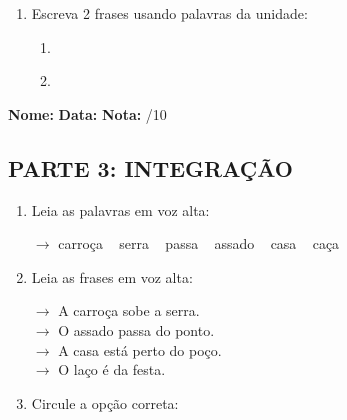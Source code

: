 \begin{exercicio}
\begin{enumerate}[resume]
  \item Escreva 2 frases usando palavras da unidade:
  \begin{enumerate}[label=\alph*)]
    \item \underline{\hspace{8cm}}
    \item \underline{\hspace{8cm}}
  \end{enumerate}

\end{enumerate}

\end{exercicio}



\begin{exercicio}

\noindent\textbf{Nome:} \underline{\hspace{3.2cm}} \quad \textbf{Data:} \underline{\hspace{1.6cm}} \quad \textbf{Nota:} \underline{\hspace{0.9cm}}/10


\subsection*{PARTE 3: INTEGRAÇÃO}

\begin{enumerate}[resume]

  \item Leia as palavras em voz alta:
  \begin{center}
  $\rightarrow$ carroça ~ serra ~ passa ~ assado ~ casa ~ caça
  \end{center}

  \item Leia as frases em voz alta:
  \begin{center}
  $\rightarrow$ A carroça sobe a serra.\\
  $\rightarrow$ O assado passa do ponto.\\
  $\rightarrow$ A casa está perto do poço.\\
  $\rightarrow$ O laço é da festa.\\
  \end{center}

  \item Circule a opção correta:
  \begin{enumerate}[label=(\alph*)]


\end{enumerate}
\end{enumerate}
\end{exercicio}
